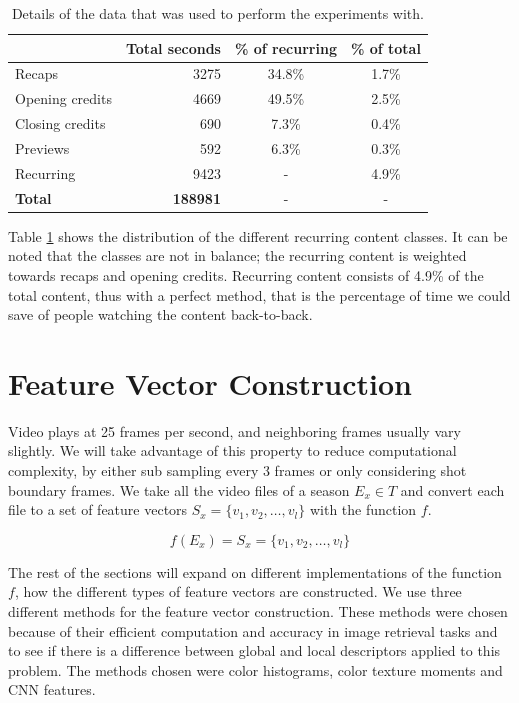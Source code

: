 \documentclass{report}
\begin{document}
\begin{table}[h]
	\begin{adjustwidth}{-.5in}{-.5in}  
		\begin{center}
			\begin{tabular}{ l | r c c}
								& Total seconds & \% of recurring 	& \% of total \\
				\hline
				Recaps 			& 3275 			& 34.8\% 			& 1.7\% \\
				Opening credits	& 4669			& 49.5\%			& 2.5\%	\\
				Closing credits	& 690			& 7.3\%				& 0.4\%	\\
				Previews		& 592			& 6.3\%				& 0.3\% \\
				\hline
				Recurring		& 9423			& -					& 4.9\% \\
				\textbf{Total}	& \textbf{188981}		& -					& -
			\end{tabular}
		\end{center}
	\end{adjustwidth}
	\caption{Details of the data that was used to perform the experiments with.}
	\label{table:datastatistics}
\end{table}

Table \ref{table:datastatistics} shows the distribution of the different recurring content classes. It can be noted that the classes are not in balance; the recurring content is weighted towards recaps and opening credits. Recurring content consists of 4.9\% of the total content, thus with a perfect method, that is the percentage of time we could save of people watching the content back-to-back.

\section{Feature Vector Construction}
Video plays at 25 frames per second, and neighboring frames usually vary slightly. We will take advantage of this property to reduce computational complexity, by either sub sampling every 3 frames or only considering shot boundary frames. We take all the video files of a season $E_x \in T$ and convert each file to a set of feature vectors $S_x = \{v_1, v_2, \dots, v_l\}$ with the function $f$.

\[f(E_x) = S_x = \{v_1, v_2, \dots, v_l\}\]

The rest of the sections will expand on different implementations of the function $f$, how the different types of feature vectors are constructed. We use three different methods for the feature vector construction. These methods were chosen because of their efficient computation and accuracy in image retrieval tasks and to see if there is a difference between global and local descriptors applied to this problem. The methods chosen were color histograms, color texture moments and CNN features.
\end{document}
